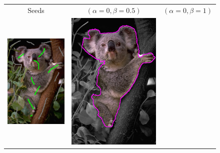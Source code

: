 \documentclass[runningheads]{llncs}
\begin{document}
\begin{figure}
\center
\begin{tabular}{ccc}
Seeds & $(\alpha=0, \beta=0.5)$ & $(\alpha=0,\beta=1)$ \\
 	\includegraphics[scale=0.25]{images/segmentation/coala/seeds.png} & 
	\includegraphics[scale=0.25]{images/segmentation/coala/r3/lg0_sq05_dt1_it50.png} & 

\end{tabular}
\end{figure}
\end{document}
